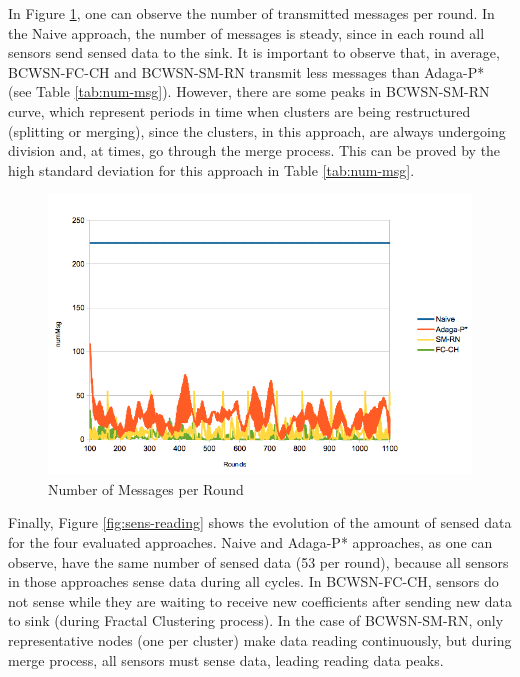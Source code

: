 \documentclass{acm_proc_article-sp}
\begin{document}
In Figure \ref{fig:num-msg}, one can observe the number of transmitted messages
per round. In the Naive approach, the number of messages is steady, since in
each round all sensors send sensed data to the sink. It is important to observe
that, in average, BCWSN-FC-CH and BCWSN-SM-RN transmit less messages than Adaga-P*
(see Table \ref{tab:num-msg}). However, there are some peaks in BCWSN-SM-RN
curve, which represent periods in time when clusters are being restructured
(splitting or merging), since the clusters, in this approach, are always
undergoing division and, at times, go through the merge process. This can be
proved by the high standard deviation for this approach in Table
\ref{tab:num-msg}.

\begin{figure}[!htb]
\begin{center}
	\includegraphics[scale=0.35]{WsneeFD_NumMsgPerRound.png}
    \caption{Number of Messages per Round}
    \label{fig:num-msg}
\end{center}
\end{figure}


Finally, Figure \ref{fig:sens-reading} shows the evolution of the amount of
sensed data for the four evaluated approaches.
Naive and Adaga-P* approaches, as one can observe, have the same number of
sensed data (53 per round), because all sensors in those approaches sense data
during all cycles. In BCWSN-FC-CH, sensors do not sense while they are waiting to
receive new coefficients after sending new data to sink (during Fractal
Clustering process). In the case of BCWSN-SM-RN, only representative nodes (one
per cluster) make data reading continuously, but during merge process, all sensors
must sense data, leading reading data peaks.
\end{document}

